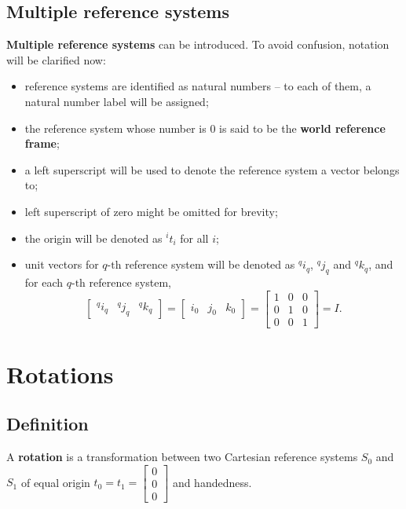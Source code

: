 \documentclass[10pt]{report}
\begin{document}
\subsection{Multiple reference systems}
\label{sec:org6f4e962}
\textbf{Multiple reference systems} can be introduced. To avoid confusion, notation will be clarified now:
\begin{itemize}
\item reference systems are identified as natural numbers -- to each of them, a natural number label will be assigned;
\item the reference system whose number is \(0\) is said to be the \textbf{world reference frame};
\item a left superscript will be used to denote the reference system a vector belongs to;
\item left superscript of zero might be omitted for brevity;
\item the origin will be denoted as \({}^{i}t_i\) for all \(i\);
\item unit vectors for \(q\mbox{-th}\) reference system will be denoted as \({}^qi_q\), \({}^qj_q\) and \({}^qk_q\), and for each \(q\mbox{-th}\) reference system, $$\begin{bmatrix} {}^qi_q & {}^qj_q & {}^qk_q \end{bmatrix} = \begin{bmatrix} i_0 & j_0 & k_0 \end{bmatrix} = \begin{bmatrix} 1 & 0 & 0 \\ 0 & 1 & 0 \\ 0 & 0 & 1 \end{bmatrix} = I.$$
\end{itemize}
\section{Rotations}
\label{sec:org2e9601f}

\subsection{Definition}
\label{sec:org0ad8ebe}

A \textbf{rotation} is a transformation between two Cartesian reference systems \(S_0\) and \(S_1\) of equal origin \(t_0 = t_1 = \begin{bmatrix}0 \\ 0 \\ 0 \end{bmatrix}\) and handedness.
\end{document}
